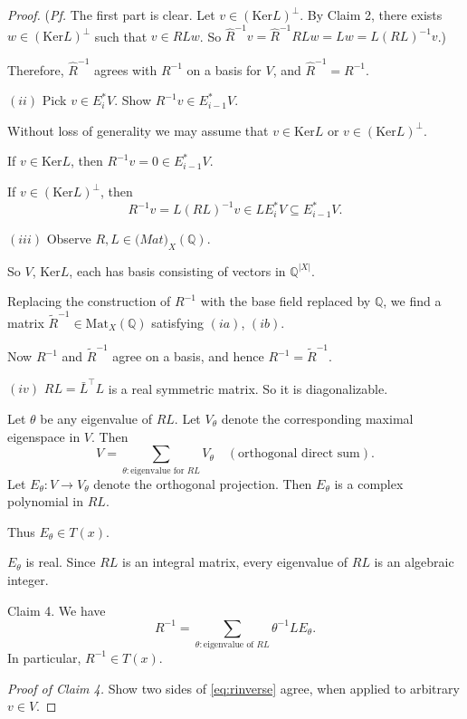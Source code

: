 \documentclass[
]{book}
\theoremstyle{definition}
\theoremstyle{definition}
\theoremstyle{definition}
\theoremstyle{definition}
\theoremstyle{remark}
\begin{document}
\begin{proof}
(\emph{Pf.} The first part is clear. Let \(v\in (\mathrm{Ker}L)^\bot\). By Claim 2, there exists \(w\in (\mathrm{Ker}L)^\bot\) such that \(v\in RLw\). So \(\hat{R}^{-1}v = \hat{R}^{-1}RLw = Lw = L(RL)^{-1}v\).)

Therefore, \(\hat{R}^{-1}\) agrees with \(R^{-1}\) on a basis for \(V\), and \(\hat{R}^{-1} = R^{-1}\).

\((ii)\) Pick \(v\in E^*_iV\). Show \(R^{-1}v\in E^*_{i-1}V\).

Without loss of generality we may assume that \(v\in \mathrm{Ker}L\) or \(v\in (\mathrm{Ker}L)^\bot\).

If \(v\in \mathrm{Ker}L\), then \(R^{-1}v = 0\in E^*_{i-1}V\).

If \(v\in (\mathrm{Ker}L)^\bot\), then
\[R^{-1}v = L(RL)^{-1}v \in LE^*_iV \subseteq E^*_{i-1}V.\]

\((iii)\) Observe \(R, L\in \mathrm(Mat)_X(\mathbb{Q})\).

So \(V\), \(\mathrm{Ker}L\), each has basis consisting of vectors in \(\mathbb{Q}^{|X|}\).

Replacing the construction of \(R^{-1}\) with the base field replaced by \(\mathbb{Q}\), we find a matrix \(\tilde{R}^{-1}\in \mathrm{Mat}_X(\mathbb{Q})\) satisfying \((ia)\), \((ib)\).

Now \(R^{-1}\) and \(\tilde{R}^{-1}\) agree on a basis, and hence \(R^{-1} = \tilde{R}^{-1}\).

\((iv)\) \(RL = \bar{L}^\top L\) is a real symmetric matrix. So it is diagonalizable.

Let \(\theta\) be any eigenvalue of \(RL\). Let \(V_\theta\) denote the corresponding maximal eigenspace in \(V\).
Then
\[V = \sum_{\theta:\text{eigenvalue for }RL}V_\theta \quad (\text{orthogonal direct sum}).\]
Let \(E_\theta: V\to V_\theta\) denote the orthogonal projection. Then \(E_\theta\) is a complex polynomial in \(RL\).

Thus \(E_\theta\in T(x)\).

\(E_\theta\) is real. Since \(RL\) is an integral matrix, every eigenvalue of \(RL\) is an algebraic integer.

Claim 4. We have
\begin{equation}
R^{-1} = \sum_{\theta: \text{eigenvalue of }RL}\theta^{-1}LE_\theta. \label{eq:rinverse}
\end{equation}
In particular, \(R^{-1}\in T(x)\).

\emph{Proof of Claim 4.}
Show two sides of \eqref{eq:rinverse} agree, when applied to arbitrary \(v\in V\).


\end{proof}
\end{document}

